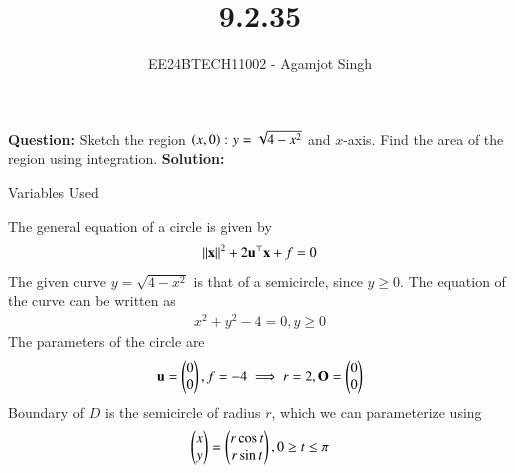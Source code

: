 \documentclass[journal]{IEEEtran}
\begin{document}

\vspace{3cm}

\title{9.2.35}
\author{EE24BTECH11002 - Agamjot Singh}
{\let\newpage\relax\maketitle}

\renewcommand{\thefigure}{\theenumi}
\renewcommand{\thetable}{\theenumi}
\setlength{\intextsep}{10pt} %

\textbf{Question:}
\newline
Sketch the region $\left(x, 0\right) \colon y = \sqrt{4 - x^2}$ and $x$-axis. Find the area of the region using integration.
\newline
\textbf{Solution:}

\begin{table}[h!]
	\centering
	
	\caption{Variables Used}
	\label{tab9.2.35}
\end{table}

The general equation of a circle is given by 
\begin{align}
	\left\lVert\mathbf{x}\right\rVert^2 + 2\mathbf{u}^\top\mathbf{x} + f = 0
\end{align}
The given curve $y = \sqrt{4 - x^2}$ is that of a semicircle, since $y \geq 0$.
\newline
The equation of the curve can be written as
\begin{align}
	x^2 + y^2 - 4 = 0, y \geq 0
\end{align}
The parameters of the circle are
\begin{align}
	\mathbf{u} = \begin{pmatrix}0\\0\end{pmatrix}, f = -4 \implies r = 2, \mathbf{O} = \begin{pmatrix}0\\0\end{pmatrix}
\end{align}
Boundary of $D$ is the semicircle of radius $r$, which we can parameterize  using
\begin{align}
	\begin{pmatrix}x\\y\end{pmatrix} = \begin{pmatrix}r\cos{t}\\r\sin{t}\end{pmatrix}, 0\geq t \leq \pi
\end{align}
\end{document}
